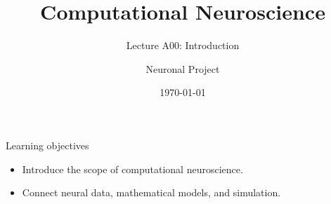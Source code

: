 \documentclass[aspectratio=169]{beamer}
\title{Computational Neuroscience}
\subtitle{Lecture A00: Introduction}
\author{Neuronal Project}
\date{\today}
\begin{document}
\frame{\titlepage}
\begin{frame}{Learning objectives}
\begin{itemize}
\item Introduce the scope of computational neuroscience.
\item Connect neural data, mathematical models, and simulation.
\end{itemize}
\end{frame}
\end{document}
